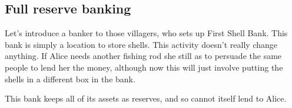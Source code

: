 
\subsection{Full reserve banking}

Let’s introduce a banker to those villagers, who sets up First Shell Bank. This bank is simply a location to store shells. This activity doesn’t really change anything. If Alice needs another fishing rod she still as to persuade the same people to lend her the money, although now this will just involve putting the shells in a different box in the bank.

This bank keeps all of its assets as reserves, and so cannot itself lend to Alice.

